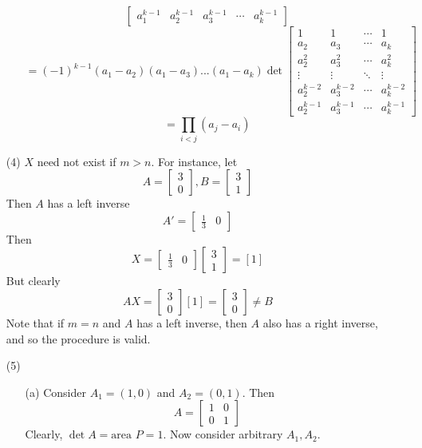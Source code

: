 \documentclass[12pt]{article}
\begin{document}
\begin{itemize}
\begin{itemize}
$$\begin{bmatrix}
a_1^{k-1} & a_2^{k-1} & a_3^{k-1} & \cdots & a_k^{k-1}
\end{bmatrix}$$
$$= (-1)^{k-1}(a_1 - a_2)(a_1 - a_3)...(a_1 - a_k)\det\begin{bmatrix}
1 & 1 & \cdots & 1 \\
a_2 & a_3 & \cdots & a_k \\
a_2^2 & a_3^2 & \cdots & a_k^2 \\
\vdots & \vdots & \ddots & \vdots \\
a_2^{k-2} & a_3^{k-2} & \cdots & a_k^{k-2} \\
a_2^{k-1} & a_3^{k-1} & \cdots & a_k^{k-1}
\end{bmatrix}$$
$$= \prod_{i < j}(a_j - a_i)$$
\end{itemize}
\item[(4)]
$X$ need not exist if $m > n$. For instance, let
$$A = \begin{bmatrix}
3 \\
0
\end{bmatrix}, B = \begin{bmatrix}
3 \\
1
\end{bmatrix}$$
Then $A$ has a left inverse
$$A' = \begin{bmatrix}
\frac{1}{3} & 0
\end{bmatrix}$$
Then
$$X = \begin{bmatrix}
\frac{1}{3} & 0
\end{bmatrix}\begin{bmatrix}
3 \\
1
\end{bmatrix} = [1]$$
But clearly
$$AX = \begin{bmatrix}
3 \\
0
\end{bmatrix}[1] = \begin{bmatrix}
3 \\
0
\end{bmatrix} \neq B$$
Note that if $m = n$ and $A$ has a left inverse, then $A$ also has a right inverse, and so the procedure is valid.
\item[(5)]
\begin{itemize}
\item[(a)]
Consider $A_1 = (1, 0)$ and $A_2 = (0, 1)$. Then
$$A = \begin{bmatrix}
1 & 0 \\
0 & 1
\end{bmatrix}$$
Clearly, $\det A = \text{area } P = 1$. Now consider arbitrary $A_1, A_2$. 


\end{itemize}
\end{itemize}
\end{document}
